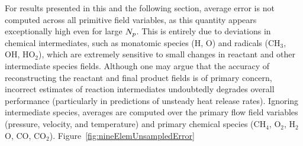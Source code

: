 For results presented in this and the following section, average error is not computed across all primitive field variables, as this quantity appears exceptionally high even for large $N_p$. This is entirely due to deviations in chemical intermediates, such as monatomic species (H, O) and radicals (CH$_3$, OH, HO$_2$), which are extremely sensitive to small changes in reactant and other intermediate species fields. Although one may argue that the accuracy of reconstructing the reactant and final product fields is of primary concern, incorrect estimates of reaction intermediates undoubtedly degrades overall performance (particularly in predictions of unsteady heat release rates). Ignoring intermediate species, averages are computed over the primary flow field variables (pressure, velocity, and temperature) and primary chemical species (CH$_4$, O$_2$, H$_2$O, CO, CO$_2$). Figure~\ref{fig:nineElemUnsampledError}

